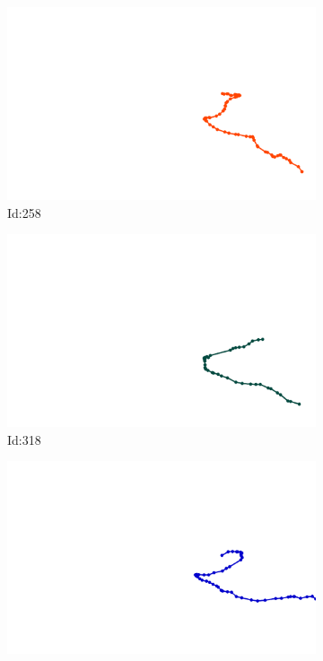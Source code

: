 \documentclass[12pt,twoside]{report}
\begin{document}
\begin{figure}
\centering
\begin{subfigure}[b]{0.20\textwidth}
\centering
\includegraphics[width=\textwidth]{../../trajectories/258.png}
\caption{Id:258}
\end{subfigure}
\begin{subfigure}[b]{0.20\textwidth}
\centering
\includegraphics[width=\textwidth]{../../trajectories/318.png}
\caption{Id:318}
\end{subfigure}
\begin{subfigure}[b]{0.20\textwidth}
\centering
\includegraphics[width=\textwidth]{../../trajectories/382.png}

\end{subfigure}
\end{figure}
\end{document}
